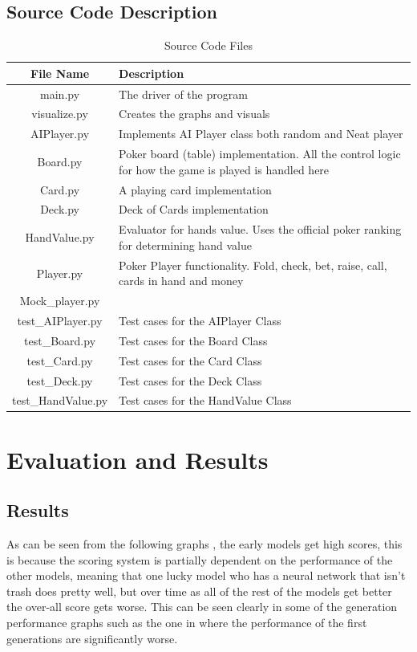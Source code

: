 \subsection{Source Code Description}
\begin{table}[H]
    \caption{Source Code Files}
    \centering
    \begin{tabular}{ | c | p{14cm} |}
    \hline
         File Name & Description \\
        \hline
        \hline
        main.py & The driver of the program\\ \hline
        visualize.py & Creates the graphs and visuals\\ \hline
        AIPlayer.py & Implements AI Player class both random and Neat player\\ \hline
        Board.py & Poker board (table) implementation. All the control logic for how the game is played is handled here\\ \hline
        Card.py & A playing card implementation\\ \hline
        Deck.py & Deck of Cards implementation\\ \hline
        HandValue.py & Evaluator for hands value. Uses the official poker ranking for determining hand value\\ \hline
        Player.py & Poker Player functionality. Fold, check, bet, raise, call, cards in hand and money\\
        Mock\_player.py & \\ \hline
        test\_AIPlayer.py & Test cases for the AIPlayer Class \\ \hline
        test\_Board.py & Test cases for the Board Class\\ \hline
        test\_Card.py & Test cases for the Card Class\\ \hline
        test\_Deck.py & Test cases for the Deck Class\\ \hline
        test\_HandValue.py & Test cases for the HandValue Class\\
        
    \hline
    \end{tabular}
    \label{tab:sourceCode}
\end{table}

\section{Evaluation and Results}

\subsection{Results}
As can be seen from the following graphs , the early models get high scores, this is because
the scoring system is partially dependent on the performance of the other models, meaning that one lucky model
who has a neural network that isn't trash does pretty well, but over time as all of the rest of the models get
better the over-all score gets worse. This can be seen clearly in some of the generation performance graphs such
as the one in  where the performance of the first generations are significantly worse.



